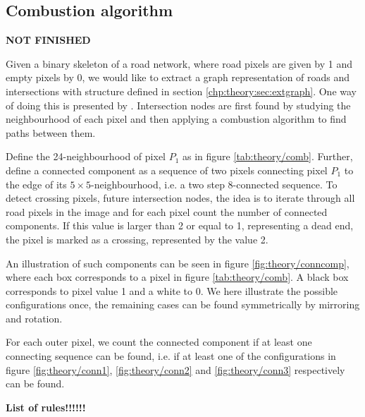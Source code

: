 



\subsection{Combustion algorithm}
\label{chp:theory.sec:mapgen.sub:comb}

\textbf{NOT FINISHED}

Given a binary skeleton of a road network, where road pixels are given by 1 and empty pixels by 0, we would like to extract a graph representation of roads and intersections with structure defined in section \ref{chp:theory:sec:extgraph}. One way of doing this is presented by \cite{21inBiagioni}. Intersection nodes are first found by studying the neighbourhood of each pixel and then applying a combustion algorithm to find paths between them.

Define the 24-neighbourhood of pixel $P_1$ as in figure \ref{tab:theory/comb}. Further, define a connected component as a sequence of two pixels connecting pixel $P_1$ to the edge of its $5\times 5$-neighbourhood, i.e. a two step 8-connected sequence. To detect crossing pixels, future intersection nodes, the idea is to iterate through all road pixels in the image and for each pixel count the number of connected components. If this value is larger than 2 or equal to 1, representing a dead end, the pixel is marked as a crossing, represented by the value 2. 

An illustration of such components can be seen in figure \ref{fig:theory/conncomp}, where each box corresponds to a pixel in figure \ref{tab:theory/comb}. A black box corresponds to pixel value 1 and a white to 0. We here illustrate the possible configurations once, the remaining cases can be found symmetrically by mirroring and rotation. 

For each outer pixel, we count the connected component if at least one connecting sequence can be found, i.e. if at least one of the configurations in figure \ref{fig:theory/conn1}, \ref{fig:theory/conn2} and \ref{fig:theory/conn3} respectively can be found.  

\textbf{List of rules!!!!!!}

